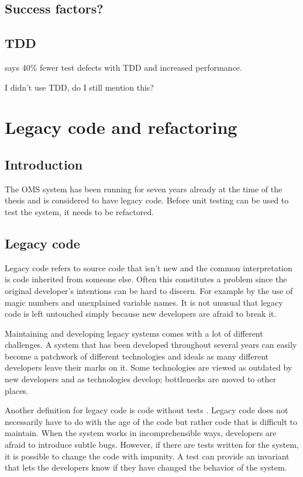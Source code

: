 \documentclass{article}
\begin{document}
		\subsection{Success factors?}


		\subsection{TDD}
		\cite{unit} says 40\% fewer test defects with TDD and increased performance. 

		I didn't use TDD, do I still mention this?

	\section{Legacy code and refactoring}
		\subsection{Introduction}
		The OMS system has been running for seven years already at the time of the thesis and is considered to have legacy code. Before unit testing can be used to test the system, it needs to be refactored. 

		\subsection{Legacy code}
		Legacy code refers to source code that isn't new and the common interpretation is code inherited from someone else. Often this constitutes a problem since the original developer's intentions can be hard to discern. For example by the use of magic numbers and unexplained variable names. It is not unusual that legacy code is left untouched simply because new developers are afraid to break it.

		Maintaining and developing legacy systems comes with a lot of different challenges. A system that has been developed throughout several years can easily become a patchwork of different technologies and ideals as many different developers leave their marks on it. Some technologies are viewed as outdated by new developers and as technologies develop; bottlenecks are moved to other places.

		Another definition for legacy code is code without tests \cite{legacy}. Legacy code does not necessarily have to do with the age of the code but rather code that is difficult to maintain. When the system works in incomprehensible ways, developers are afraid to introduce subtle bugs. However, if there are tests written for the system, it is possible to change the code with impunity. A test can provide an invariant that lets the developers know if they have changed the behavior of the system.
\end{document}
